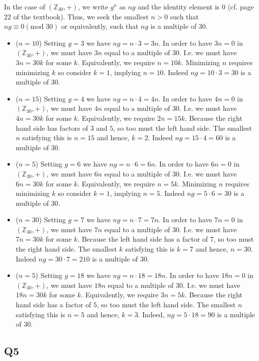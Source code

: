\documentclass[12pt]{article}
\def\Z{{\mathbb Z}}        %
\numberwithin{theorem}{section}
\numberwithin{equation}{section}
\numberwithin{remark}{section}
\numberwithin{definition}{section}
\numberwithin{theorem}{section}
\numberwithin{lemma}{section}
\numberwithin{example}{section}
\begin{document}
In the case of $(\Z_{30},+)$, we write $g^n$ as $ng$ and the identity element is $0$ (cf. page 22 of the textbook). Thus, we seek the smallest $n>0$ such that $ng\equiv0(\text{mod }{30})$ or equivalently, such that $ng$ is a multiple of 30.
\begin{itemize}
	\item{($n=10$) Setting $g=3$ we have $ng=n\cdot3=3n$. In order to have $3n=0$ in $(\Z_{30},+)$, we must have $3n$ equal to a multiple of $30$. I.e. we must have $3n=30k$ for some $k$. Equivalently, we require $n=10k$. Minimizing $n$ requires minimizing $k$ so consider $k=1$, implying $n=10$. Indeed $ng=10\cdot 3=30$ is a multiple of 30.}
	\item{($n=15$) Setting $g=4$ we have $ng=n\cdot4=4n$. In order to have $4n=0$ in $(\Z_{30},+)$, we must have $4n$ equal to a multiple of $30$. I.e. we must have $4n=30k$ for some $k$. Equivalently, we require $2n=15k$. Because the right hand side has factors of $3$ and $5$, so too must the left hand side. The smallest $n$ satisfying this is $n=15$ and hence, $k=2$. Indeed $ng=15\cdot4=60$ is a multiple of 30.}
	\item{($n=5$) Setting $g=6$ we have $ng=n\cdot6=6n$. In order to have $6n=0$ in $(\Z_{30},+)$, we must have $6n$ equal to a multiple of $30$. I.e. we must have $6n=30k$ for some $k$. Equivalently, we require $n=5k$. Minimizing $n$ requires minimizing $k$ so consider $k=1$, implying $n=5$. Indeed $ng=5\cdot 6=30$ is a multiple of 30.}
	\item{($n=30$) Setting $g=7$ we have $ng=n\cdot7=7n$. In order to have $7n=0$ in $(\Z_{30},+)$, we must have $7n$ equal to a multiple of $30$. I.e. we must have $7n=30k$ for some $k$. Because the left hand side has a factor of 7, so too must the right hand side. The smallest $k$ satisfying this is $k=7$ and hence, $n=30$. Indeed $ng=30\cdot7=210$ is a multiple of 30.}
	\item({$n=5$) Setting $g=18$ we have $ng=n\cdot18=18n$. In order to have $18n=0$ in $(\Z_{30},+)$, we must have $18n$ equal to a multiple of $30$. I.e. we must have $18n=30k$ for some $k$. Equivalently, we require $3n=5k$. Because the right hand side has a factor of $5$, so too must the left hand side. The smallest $n$ satisfying this is $n=5$ and hence, $k=3$. Indeed, $ng=5\cdot18=90$ is a multiple of 30.}
\end{itemize}



\subsection{Q5}
\end{document}
